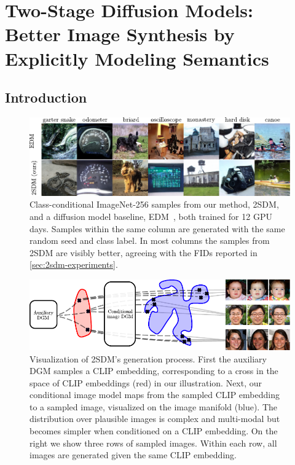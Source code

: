 \chapter{Two-Stage Diffusion Models:  Better Image Synthesis by Explicitly Modeling Semantics}

\section{Introduction}


\begin{figure}[b]
    \includegraphics[width=\textwidth]{figs/2sdm/2SDM-main-fig.pdf}
    \caption{Class-conditional ImageNet-256 samples from our method, 2SDM, and a diffusion model baseline, EDM~\citep{karras2022elucidating}, both trained for 12 GPU days. Samples within the same column are generated with the same random seed and class label. In most columns the samples from 2SDM are visibly better, agreeing with the FIDs reported in \cref{sec:2sdm-experiments}.}
    \label{fig:latent-imagenet-samples}
\end{figure}


\begin{figure}[t]
    \centering
    \includegraphics{figs/2sdm/vcdm-diagram.pdf}
    \caption{Visualization of 2SDM's generation process. First the auxiliary DGM samples a CLIP embedding, corresponding to a cross in the space of CLIP embeddings (red) in our illustration. Next, our conditional image model maps from the sampled CLIP embedding to a sampled image, visualized on the image manifold (blue). The distribution over plausible images is complex and multi-modal but becomes simpler when conditioned on a CLIP embedding. On the right we show three rows of sampled images. Within each row, all images are generated given the same CLIP embedding.}
    \label{fig:samples}
\end{figure}


